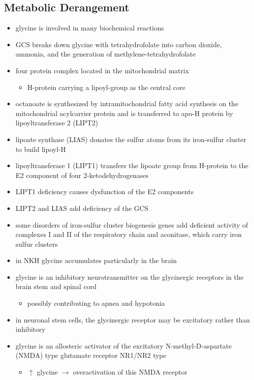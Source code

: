 \documentclass{scrartcl}
\begin{document}
\subsection{Metabolic Derangement}
\label{sec:org444004c}
\begin{itemize}
\item glycine is involved in many biochemical reactions
\item GCS breaks down glycine with tetrahydrofolate into carbon dioxide,
ammonia, and the generation of methylene-tetrahydrofolate
\item four protein complex located in the mitochondrial matrix
\begin{itemize}
\item H-protein carrying a lipoyl-group as the central core
\end{itemize}
\item octanoate is synthesized by intramitochondrial fatty acid synthesis
on the mitochondrial acylcarrier protein and is transferred to apo-H
protein by lipoyltransferase 2 (LIPT2)
\item lipoate synthase (LIAS) donates the sulfur atoms from its
iron-sulfur cluster to build lipoyl-H
\item lipoyltransferase 1 (LIPT1) transfers the lipoate group from
H-protein to the E2 component of four 2-ketodehydrogenases
\item LIPT1 deficiency causes dysfunction of the E2 components
\item LIPT2 and LIAS add deficiency of the GCS
\item some disorders of iron-sulfur cluster biogenesis genes add deficient
activity of complexes I and II of the respiratory chain and
aconitase, which carry iron sulfur clusters
\item in NKH glycine accumulates particularly in the brain
\item glycine is an inhibitory neurotransmitter on the glycinergic
receptors in the brain stem and spinal cord
\begin{itemize}
\item possibly contributing to apnea and hypotonia
\end{itemize}
\item in neuronal stem cells, the glycinergic receptor may be excitatory
rather than inhibitory
\item glycine is an allosteric activator of the excitatory
N-methyl-D-aspartate (NMDA) type glutamate receptor NR1/NR2 type
\begin{itemize}
\item \(\uparrow\) glycine \(\to\) overactivation of this NMDA receptor
\end{itemize}
\end{itemize}
\end{document}
